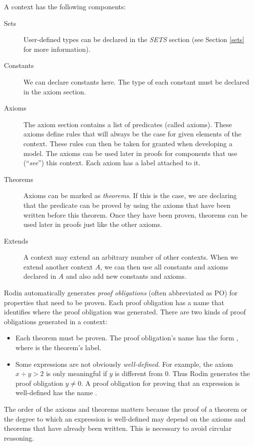 A context has the following components:
\begin{description}
\item[Sets]
  User-defined types can be declared in the \textsl{SETS} section
  (see Section \ref{sets} for more information).
\item[Constants]
  We can declare constants here. The type of each constant must be declared in the axiom section.
\item[Axioms] The axiom section contains a list of predicates (called axioms).
  These axioms define rules that will always be the case for given elements of the context. These rules can then be taken for granted when developing a model.
  The axioms can be used later in proofs for components that
  use (``\emph{see}'') this context.
  Each axiom has a label attached to it.
\item[Theorems]
  Axioms can be marked as \emph{theorems}. If this is the case, we are declaring that
  the predicate can be proved by using the axioms that have been written 
  before this theorem.
  Once they have been proven, theorems can be used later in proofs just like the other axioms.
\item[Extends]
  A context may extend an arbitrary number of other contexts.
  When we extend another context $A$, we can then use all constants and axioms declared in $A$ and also add new constants
  and axioms.
\end{description}
Rodin automatically generates \emph{proof obligations} (often abbreviated as PO) for properties that need to be proven. Each proof obligation has a name that identifies where the proof obligation was generated.
There are two kinds of proof obligations generated in a context:
\begin{itemize}
  \item Each theorem must be proven. The proof obligation's name has the form 
    , where  is the theorem's label.
  \item Some expressions are not obviously \emph{well-defined}. For example, the axiom $x \div y > 2$ is only meaningful if $y$ is different from 0.
    Thus Rodin generates the proof obligation $y\neq 0$.
    A proof obligation for proving that an expression is well-defined has the name .
\end{itemize}
The order of the axioms and theorems matters because the proof of a theorem or the degree to which an expression is well-defined may depend on the axioms and theorems that have already been written. This is necessary to avoid circular reasoning.


